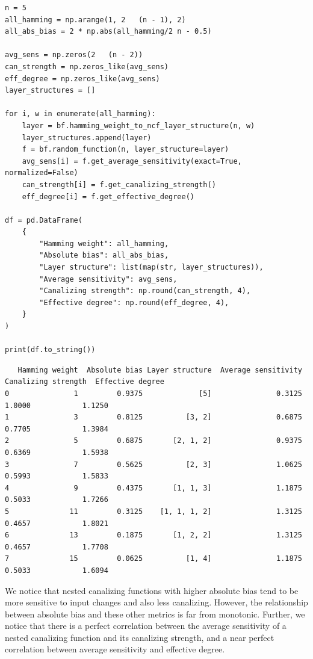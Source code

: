 \documentclass[
]{article}
\begin{document}
\begin{lstlisting}
n = 5
all_hamming = np.arange(1, 2   (n - 1), 2)
all_abs_bias = 2 * np.abs(all_hamming/2 n - 0.5)

avg_sens = np.zeros(2   (n - 2))
can_strength = np.zeros_like(avg_sens)
eff_degree = np.zeros_like(avg_sens)
layer_structures = []

for i, w in enumerate(all_hamming):
    layer = bf.hamming_weight_to_ncf_layer_structure(n, w)
    layer_structures.append(layer)
    f = bf.random_function(n, layer_structure=layer)
    avg_sens[i] = f.get_average_sensitivity(exact=True, normalized=False)
    can_strength[i] = f.get_canalizing_strength()
    eff_degree[i] = f.get_effective_degree()

df = pd.DataFrame(
    {
        "Hamming weight": all_hamming,
        "Absolute bias": all_abs_bias,
        "Layer structure": list(map(str, layer_structures)),
        "Average sensitivity": avg_sens,
        "Canalizing strength": np.round(can_strength, 4),
        "Effective degree": np.round(eff_degree, 4),
    }
)

print(df.to_string())
\end{lstlisting}

\begin{lstlisting}
   Hamming weight  Absolute bias Layer structure  Average sensitivity  Canalizing strength  Effective degree
0               1         0.9375             [5]               0.3125               1.0000            1.1250
1               3         0.8125          [3, 2]               0.6875               0.7705            1.3984
2               5         0.6875       [2, 1, 2]               0.9375               0.6369            1.5938
3               7         0.5625          [2, 3]               1.0625               0.5993            1.5833
4               9         0.4375       [1, 1, 3]               1.1875               0.5033            1.7266
5              11         0.3125    [1, 1, 1, 2]               1.3125               0.4657            1.8021
6              13         0.1875       [1, 2, 2]               1.3125               0.4657            1.7708
7              15         0.0625          [1, 4]               1.1875               0.5033            1.6094
\end{lstlisting}

We notice that nested canalizing functions with higher absolute bias
tend to be more sensitive to input changes and also less canalizing.
However, the relationship between absolute bias and these other metrics
is far from monotonic. Further, we notice that there is a perfect
correlation between the average sensitivity of a nested canalizing
function and its canalizing strength, and a near perfect correlation
between average sensitivity and effective degree.
\end{document}

